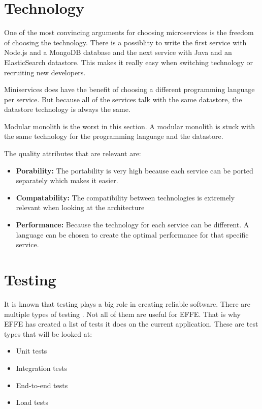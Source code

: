 \section{Technology}
\label{sec:Technology}

One of the most convincing arguments for choosing microservices is the freedom of choosing the technology. There is a possiblity to write the first service with Node.js and a MongoDB database and the next service with Java and an ElasticSearch datastore. This makes it really easy when switching technology or recruiting new developers.

Miniservices does have the benefit of choosing a different programming language per service. But because all of the services talk with the same datastore, the datastore technology is always the same.

Modular monolith is the worst in this section. A modular monolith is stuck with the same technology for the programming language and the datastore.

The quality attributes that are relevant are:
\begin{itemize}
        \item \textbf{Porability:} The portability is very high because each service can be ported separately which makes it easier.
        \item \textbf{Compatability:} The compatibility between technologies is extremely relevant when looking at the architecture
        \item \textbf{Performance:} Because the technology for each service can be different. A language can be chosen to create the optimal performance for that specific service.
\end{itemize}

\section{Testing}
\label{sec:Testing}

It is known that testing plays a big role in creating reliable software. There are multiple types of testing \cite{testTypes}. Not all of them are useful for EFFE. That is why EFFE has created a list of tests it does on the current application. These are test types that will be looked at:

\begin{itemize}
        \item Unit tests
        \item Integration tests
        \item End-to-end tests
        \item Load tests
\end{itemize}

